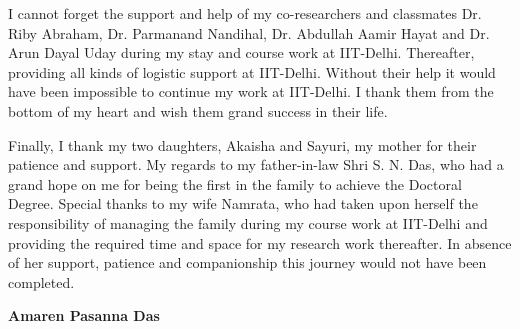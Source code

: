 I cannot forget the support and help of my co-researchers and classmates Dr. Riby Abraham, Dr. Parmanand Nandihal, Dr. Abdullah Aamir Hayat and Dr. Arun Dayal Uday during my stay and course work at IIT-Delhi. Thereafter, providing all kinds of logistic support at IIT-Delhi. Without their help it would have been impossible to continue my work at IIT-Delhi. I thank them from the bottom of my heart and wish them grand success  in their life.


Finally, I thank my two daughters, Akaisha and Sayuri, my mother for their patience  and support. My regards to my father-in-law Shri S. N. Das, who had a grand hope on me for being the first in the family to achieve the Doctoral Degree. Special thanks to my wife Namrata, who had taken upon herself  the responsibility of managing the family during my course work at IIT-Delhi and providing the required time and space for my research work thereafter. In absence of  her support, patience and companionship this journey would not have been completed.  



\bigskip
\bigskip
\bigskip
\bigskip

\hfill \textbf{Amaren Pasanna Das}

\restoregeometry
